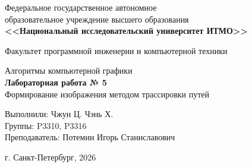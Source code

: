 \begin{titlepage}
\centering
Федеральное государственное автономное\\
образовательное учреждение высшего образования\\
\textbf{<<Национальный исследовательский университет ИТМО>>}

\vspace{0.8em}
Факультет программной инженерии и компьютерной техники

\vfill
Алгоритмы компьютерной графики\\[0.8em]
\textbf{Лабораторная работа № 5}\\[0.8em]
Формирование изображения методом трассировки путей

\vfill
\begin{flushright}
Выполнили: Чжун Ц. Чэнь Х.\\[0.4em]
Группы: P3310, P3316\\[0.4em]
Преподаватель: Потемин Игорь Станиславович
\end{flushright}

\vspace{4em}
г. Санкт-Петербург, 2026
\end{titlepage}
